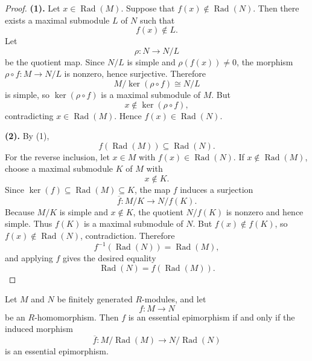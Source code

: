 \begin{proof}
    \textbf{(1).}
    Let $x\in \operatorname{Rad}(M)$. Suppose that $f(x)\notin \operatorname{Rad}(N)$.
    Then there exists a maximal submodule $L$ of $N$ such that
    \[
        f(x)\notin L.
    \]
    Let
    \[
        \rho:N\to N/L
    \]
    be the quotient map. Since $N/L$ is simple and $\rho(f(x))\neq 0$, the morphism $\rho\circ f:M\to N/L$ is nonzero, hence surjective. Therefore
    \[
        M/\ker(\rho\circ f)\cong N/L
    \]
    is simple, so $\ker(\rho\circ f)$ is a maximal submodule of $M$. But
    \[
        x\notin \ker(\rho\circ f),
    \]
    contradicting $x\in \operatorname{Rad}(M)$. Hence $f(x)\in \operatorname{Rad}(N)$.

    \textbf{(2).}
    By (1),
    \[
        f(\operatorname{Rad}(M))\subseteq \operatorname{Rad}(N).
    \]
    For the reverse inclusion, let $x\in M$ with $f(x)\in \operatorname{Rad}(N)$. If $x\notin \operatorname{Rad}(M)$, choose a maximal submodule $K$ of $M$ with
    \[
        x\notin K.
    \]
    Since $\ker(f)\subseteq \operatorname{Rad}(M)\subseteq K$, the map $f$ induces a
    surjection
    \[
        \overline{f}:M/K\to N/f(K).
    \]
    Because $M/K$ is simple and $x\notin K$, the quotient $N/f(K)$ is nonzero and hence
    simple. Thus $f(K)$ is a maximal submodule of $N$. But $f(x)\notin f(K)$, so $f(x)\notin \operatorname{Rad}(N)$, contradiction. Therefore
    \[
        f^{-1}(\operatorname{Rad}(N))=\operatorname{Rad}(M),
    \]
    and applying $f$ gives the desired equality
    \[
        \operatorname{Rad}(N)=f(\operatorname{Rad}(M)).
    \]
\end{proof}

\begin{lemma}
    Let $M$ and $N$ be finitely generated $R$-modules, and let
    \[
        f:M\to N
    \]
    be an $R$-homomorphism. Then $f$ is an essential epimorphism if and only if the
    induced morphism
    \[
        \overline{f}:M/\operatorname{Rad}(M)\to N/\operatorname{Rad}(N)
    \]
    is an essential epimorphism.
\end{lemma}

